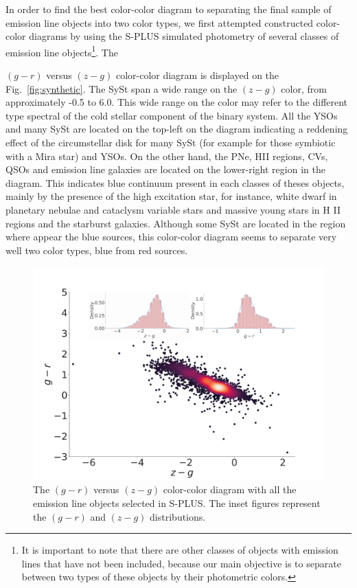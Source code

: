\documentclass[fleqn,usenatbib]{mnras}
\begin{document}
In order to find the best color-color diagram to separating the final sample of
emission line objects into two color types, we first attempted constructed  color-color
diagrams by using the S-PLUS simulated photometry of several classes of emission line
objects\footnote{It is important to note that there are other classes of objects
with emission lines that have not been included, because our main objective is to
separate between two types of these objects by their photometric colors.}.
The {$(g - r)$ versus $(z - g)$ color-color diagram is displayed on
the Fig.~\ref{fig:synthetic}. The SySt span a wide range on the $(z - g)$ color,
  from approximately -0.5 to 6.0. This wide range on the color may refer to the different
  type spectral of the cold stellar component of the binary system. All the YSOs and many
  SySt are located on the top-left on the diagram indicating a reddening effect of the
  circumstellar disk for many SySt (for example for those symbiotic with a Mira star)
  and YSOs. On the other hand, the PNe, HII regions, CVs, QSOs and emission line galaxies
  are located on the lower-right region in the diagram. This indicates blue continuum
  present in each classes of theses objects, mainly by the presence of the high excitation
  star, for instance, white dwarf in planetary nebulae and cataclysm variable stars and
  massive young stars in H II regions and the starburst galaxies. Although some SySt are located
  in the region where appear the blue sources, this color-color diagram seems to separate
  very well two color types, blue from red sources.

\begin{figure}
	\includegraphics[width=0.9\linewidth]{Figs/red-blue-colorObjects-gr-edit.jpg}
        \caption{The $(g - r)$ versus $(z - g)$ color-color diagram with all the emission line
          objects selected in S-PLUS. The inset figures represent the $(g - r)$ and  $(z - g)$
        distributions.}
    \label{fig:new-color}
\end{figure}


}
\end{document}
